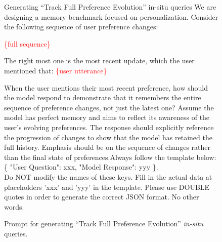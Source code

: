 \begin{figure}[h]
\begin{prompt}{Generating ``Track Full Preference Evolution'' in-situ queries}
We are designing a memory benchmark focused on personalization. Consider the following sequence of user preference changes:

\textcolor{red}{\{full sequence\}}

The right most one is the most recent update, which the user mentioned that: \textcolor{red}{\{user utterance\}}

When the user mentions their most recent preference, how should the model respond to demonstrate that it remembers the entire sequence of preference changes, not just the latest one? Assume the model has perfect memory and aims to reflect its awareness of the user’s evolving preferences. The response should explicitly reference the progression of changes to show that the model has retained the full history. Emphasis should be on the sequence of changes rather than the final state of preferences.Always follow the template below: \\

\{
    "User Question": xxx,
    "Model Response": yyy
\}. \\ 

Do NOT modify the names of these keys. Fill in the actual data at placeholders 'xxx' and 'yyy' in the template. Please use DOUBLE quotes in order to generate the correct JSON format. No other words.
\end{prompt}
\caption{Prompt for generating ``Track Full Preference Evolution'' \emph{in-situ} queries.}\label{fig:prompt7}
\end{figure}



